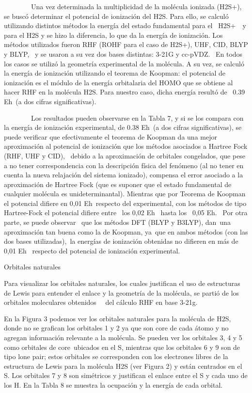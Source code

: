 \documentclass[]{article}
\begin{document}
{~~~~~~~~Una vez determinada la multiplicidad de la molécula ionizada
(}{H}{2}{S}{+}{), se buscó determinar el potencial de ionización d}{el
}{H}{2}{S}{. Para ello, se calculó utilizando distintos métodos la
energía del estado fundamental para el ~}{H}{2}{S}{+}{~}{~y para el
H}{2}{S y se hizo la diferencia, lo que da la energía de ionización. Los
métodos utilizados fueron RHF (ROHF para el caso de H}{2}{S}{+}{), UHF,
CID, BLYP y BLYP, ~y se usaron a su vez dos bases distintas: 3-21G y
cc-pVDZ. ~En todos los casos se utilizó la geometría experimental de la
molécula. A su vez, se calculó la energía de ionización utilizando el
teorema de Koopman: el potencial de ionización es el módulo de la
energía orbitalaria del H}{O}{MO que se obtiene al hacer RHF en la
molécula H}{2}{S. Para nuestro caso, dicha energía resultó de ~}{0.39
E}{h}{~(a dos cifras significativas). }

{~~~~~~~~Los resultados pueden observarse en la Tabla }{7}{, y si se los
compara con la energía de ionización experimental, de 0.38 E}{h}{~(a dos
cifras significativas), se puede verificar que efectivamente el teorema
de Koopman da una mejor aproximación al potencial de ionización que los
métodos asociados a Hartree Fock (RHF, UHF y CID), ~debido a la
aproximación de orbitales congelados, que pese a no tener
correspondencia con la descripción física del fenómeno (al no tener en
cuenta la nueva relajación del sistema ionizado), compensa el error
asociado a la aproximación de Hartree Fock (que es suponer que el estado
fundamental de cualquier molécula es unideterminantal). Mientras que por
Teorema de Koopman el potencial difiere en 0}{,}{01 E}{h}{~respecto del
experimental, con los métodos de tipo Hartree-Fock el potencial difiere
entre ~los 0}{,}{02 E}{h ~}{hasta los ~0}{,}{05 E}{h}{. ~Por otra parte,
se puede observar ~que los métodos DFT (BLYP y B3LYP), d}{an}{~una
aproximación tan buena como la de Koopman}{, ya}{~que en ambos métodos
(con las dos bases }{utilizadas),}{~la energías de ionización obtenidas
no difieren en más de 0}{,}{01 E}{h ~}{respecto del potencial de
ionización experimental.}

{}

{Orbitales naturales}

{Para visualizar los orbitales naturales, los cuales justifican el uso
de estructuras de Lewis para entender el enlace y la geometría de la
molécula, se partió de los orbitales moleculares obtenidos ~}{~}{del
cálculo RHF en base 3-21g. }

{En la Figura 3 podemos ver los orbitales naturales para la molécula de
H}{2}{S, donde no se grafican los orbitales 1 y 2 ya que son core de
cada átomo y no agregan información relevante a la molécula. Se pueden
ver los orbitales 3, 4 y 5 como orbitales de }{core}{~ubicados en el S,
mientras que los orbitales 6 y 9 son de tipo }{lone pair}{; estos
orbitales se corresponden con los electrones libres de la estructura de
Lewis para la molécula H}{2}{S (ver Figura 2) y están centrados en el S.
Los orbitales 7 y 8 son simétricos y justifican el enlace entre el S y
cada uno de los H. En la Tabla 8 se muestra la ocupación y la energía de
cada orbital.}
\end{document}
